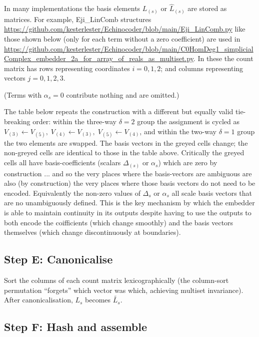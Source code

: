 \documentclass[11pt,a4paper]{article}
\newcommand{\canon}[1]{\widetilde{#1}}  %
\begin{document}
In many implementations the basis elements $L_{(s)}$ or ${\hat L}_{(s)}$ are stored as matrices.   For example, Eji\_LinComb
structures \url{https://github.com/kesterlester/Echinocoder/blob/main/Eji_LinComb.py} like those shown
below (only for each term without a zero coefficient) are used in
\url{https://github.com/kesterlester/Echinocoder/blob/main/C0HomDeg1_simplicialComplex_embedder_2a_for_array_of_reals_as_multiset.py}.
In these the count matrix has rows representing
coordinates $i{=}0,1,2$; and columns representing vectors $j{=}0,1,2,3$.


\noindent
(Terms with $\alpha_s=0$ contribute nothing and are omitted.)

\noindent
The table below repeats the construction with a different but equally valid
tie-breaking order: within the three-way $\delta\!=\!2$ group the assignment
is cycled as $V_{(3)}\!\leftarrow\!V_{(5)},\;V_{(4)}\!\leftarrow\!V_{(3)},\;
V_{(5)}\!\leftarrow\!V_{(4)}$, and within the two-way $\delta\!=\!1$ group the
two elements are swapped.  The basis vectors in the greyed cells change; the non-greyed cells
are identical to those in the table above.  Critically the greyed cells all have basis-coefficients
(scalars  $\Delta_{(s)}$ or $\alpha_{s}$) which are zero by construction ... and so
 the very places where the basis-vectors are ambiguous are also (by construction)
  the very places where those basis vectors do not need to be encoded. Equivalently the
   non-zero values of $\Delta_s$ or $\alpha_s$ all scale basis vectors that are no unambiguously defined.
    This is the key mechanism by which the embedder is able to maintain continuity in its outputs despite
      having to use the outputs to both encode the coifficients (which change smoothly) and the basis vectors
      themselves (which change discontinuously at boundaries).



\subsection*{Step E: Canonicalise}

Sort the columns of each count matrix lexicographically (the column-sort
permutation ``forgets'' which vector was which, achieving multiset invariance).
After canonicalisation, $L_s$ becomes $\canon{L_s}$.

\subsection*{Step F: Hash and assemble}
\end{document}
